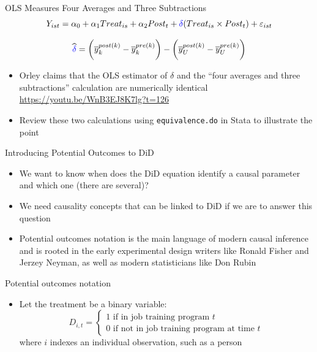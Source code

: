 \documentclass{beamer}
\begin{document}
\begin{frame}{OLS Measures Four Averages and Three Subtractions}
$$Y_{ist} = \alpha_0 + \alpha_1 Treat_{is} + \alpha_2 Post_{t} + \textcolor{blue}{\delta} (Treat_{is} \times Post_t) + \varepsilon_{ist} $$

\bigskip

$$\widehat{\textcolor{blue}{\delta}} = \bigg ( \overline{y}_k^{post(k)} - \overline{y}_k^{pre(k)} \bigg ) - \bigg ( \overline{y}_U^{post(k)} - \overline{y}_U^{pre(k)} \bigg ) $$

\begin{itemize}
\item Orley claims that the OLS estimator of $\delta$ and the ``four averages and three subtractions'' calculation are numerically identical \\ \url{https://youtu.be/WnB3EJ8K7lg?t=126}
\item Review these two calculations using \texttt{equivalence.do} in Stata to illustrate the point
\end{itemize}

\end{frame}

\begin{frame}{Introducing Potential Outcomes to DiD}

\begin{itemize}
\item We want to know when does the DiD equation identify a causal parameter and which one (there are several)?
\item We need causality concepts that can be linked to DiD if we are to answer this question
\item Potential outcomes notation is the main language of modern causal inference and is rooted in the early experimental design writers like Ronald Fisher and Jerzey Neyman, as well as modern statisticians like Don Rubin
\end{itemize}

\end{frame}




\begin{frame}{Potential outcomes notation}
	
	\begin{itemize}
	\item Let the treatment be a binary variable: $$D_{i,t} =\begin{cases} 1 \text{ if in job training program $t$} \\ 0 \text{ if not in job training program at time $t$} \end{cases}$$where $i$ indexes an individual observation, such as a person

	\end{itemize}
\end{frame}
\end{document}
